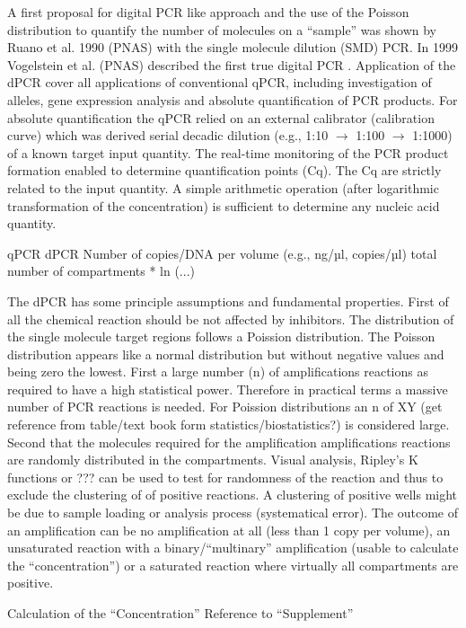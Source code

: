 \documentclass{bioinfo}
\begin{document}
A first proposal for digital PCR like approach and the use of the Poisson 
distribution to quantify the number of molecules on a ``sample'' was shown by 
Ruano et al. 1990 (PNAS) with the single molecule dilution (SMD) PCR. In 1999 
Vogelstein et al. (PNAS) described the first true digital PCR \cite{morley_digital_2014}. Application of 
the dPCR cover all applications of conventional qPCR, including investigation of 
alleles, gene expression analysis and absolute quantification of PCR products. 
For absolute quantification the qPCR relied on an external calibrator 
(calibration curve) which was derived serial decadic dilution (e.g., 1:10 $\rightarrow$ 
1:100 $\rightarrow$ 1:1000) of a known target input quantity. The real-time monitoring of 
the PCR product formation enabled to determine quantification points (Cq). The 
Cq are strictly related to the input quantity. A simple arithmetic operation 
(after logarithmic transformation of the concentration) is sufficient to 
determine any nucleic acid quantity.

qPCR	dPCR
Number of copies/DNA per volume (e.g., ng/µl, copies/µl)	total number of compartments * ln (...)

The dPCR has some principle assumptions and fundamental properties. First of all 
the chemical reaction should be not affected by inhibitors. The distribution of 
the single molecule target regions follows a Poission distribution. The Poisson 
distribution appears like a normal distribution but without negative values and 
being zero the lowest. First a large number (n) of amplifications reactions as 
required to have a high statistical power. Therefore in practical terms a 
massive number of PCR reactions is needed. For Poission distributions an n of XY 
(get reference from table/text book form statistics/biostatistics?) is 
considered large. Second that the molecules required for the amplification 
amplifications reactions are randomly distributed in the compartments. Visual 
analysis, Ripley's K functions or ??? can be used to test for randomness of the 
reaction and thus to exclude the clustering of of positive reactions. A 
clustering of positive wells might be due to sample loading or analysis process 
(systematical error). The outcome of an amplification can be no amplification at 
all (less than 1 copy per volume), an unsaturated reaction with a 
binary/``multinary'' amplification (usable to calculate the ``concentration'') 
or a saturated reaction where virtually all compartments are positive.

Calculation of the ``Concentration''
Reference to ``Supplement''
\end{document}
